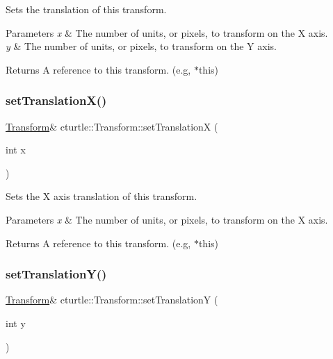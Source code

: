 Sets the translation of this transform. 


\begin{DoxyParams}{Parameters}
{\em x} & The number of units, or pixels, to transform on the X axis. \\
\hline
{\em y} & The number of units, or pixels, to transform on the Y axis. \\
\hline
\end{DoxyParams}
\begin{DoxyReturn}{Returns}
A reference to this transform. (e.\+g, $\ast$this) 
\end{DoxyReturn}
\mbox{\label{classcturtle_1_1Transform_a1ce9955dd58f54a64e3c9277c82456d1}} 
\subsubsection{\texorpdfstring{set\+Translation\+X()}{setTranslationX()}}
{\footnotesize\ttfamily \hyperlink{classcturtle_1_1Transform}{Transform}\& cturtle\+::\+Transform\+::set\+TranslationX (\begin{DoxyParamCaption}\item[{int}]{x }\end{DoxyParamCaption})\hspace{0.3cm}{\ttfamily [inline]}}



Sets the X axis translation of this transform. 


\begin{DoxyParams}{Parameters}
{\em x} & The number of units, or pixels, to transform on the X axis. \\
\hline
\end{DoxyParams}
\begin{DoxyReturn}{Returns}
A reference to this transform. (e.\+g, $\ast$this) 
\end{DoxyReturn}
\mbox{\label{classcturtle_1_1Transform_a6e861207764b8ca62152b99eb86a1f1a}} 
\subsubsection{\texorpdfstring{set\+Translation\+Y()}{setTranslationY()}}
{\footnotesize\ttfamily \hyperlink{classcturtle_1_1Transform}{Transform}\& cturtle\+::\+Transform\+::set\+TranslationY (\begin{DoxyParamCaption}\item[{int}]{y }\end{DoxyParamCaption})\hspace{0.3cm}{\ttfamily [inline]}}



